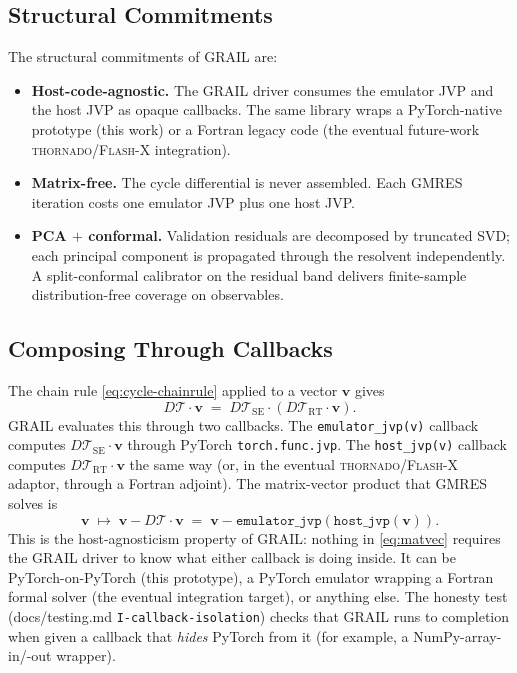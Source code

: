 \documentclass[11pt]{article}
\newcommand{\Tcyc}{\mathcal{T}}
\newcommand{\Trt}{\Tcyc_{\mathrm{RT}}}
\newcommand{\Tse}{\Tcyc_{\mathrm{SE}}}
\newcommand{\code}[1]{\texttt{#1}}
\begin{document}
\subsection{Structural Commitments}

The structural commitments of GRAIL are:
\begin{itemize}
\item \textbf{Host-code-agnostic.}  The GRAIL driver consumes the
emulator JVP and the host JVP as opaque callbacks.  The same library
wraps a PyTorch-native prototype (this work) or a Fortran legacy code
(the eventual future-work \textsc{thornado}/\textsc{Flash-X} integration).
\item \textbf{Matrix-free.}  The cycle differential is never
assembled.  Each GMRES iteration costs one emulator JVP plus one host
JVP.
\item \textbf{PCA $+$ conformal.}  Validation residuals are decomposed
by truncated SVD; each principal component is propagated through the
resolvent independently.  A split-conformal calibrator on the residual
band delivers finite-sample distribution-free coverage on
observables.
\end{itemize}

\subsection{Composing Through Callbacks}

The chain rule \eqref{eq:cycle-chainrule} applied to a vector $\mathbf{v}$
gives
\begin{equation}
D\Tcyc \cdot \mathbf{v} \;=\; D\Tse \cdot (D\Trt \cdot \mathbf{v}).
\end{equation}
GRAIL evaluates this through two callbacks.  The
\texttt{emulator\_jvp(v)} callback computes $D\Tse \cdot \mathbf{v}$
through PyTorch \code{torch.func.jvp}.  The \texttt{host\_jvp(v)}
callback computes $D\Trt \cdot \mathbf{v}$ the same way (or, in the
eventual \textsc{thornado}/\textsc{Flash-X} adaptor, through a Fortran
adjoint).  The matrix-vector product that GMRES solves is
\begin{equation}
\mathbf{v} \;\mapsto\; \mathbf{v} - D\Tcyc \cdot \mathbf{v}
\;=\; \mathbf{v} - \mathtt{emulator\_jvp}(\mathtt{host\_jvp}(\mathbf{v})).
\label{eq:matvec}
\end{equation}
This is the host-agnosticism property of GRAIL: nothing in
\eqref{eq:matvec} requires the GRAIL driver to know what either
callback is doing inside.  It can be PyTorch-on-PyTorch (this
prototype), a PyTorch emulator wrapping a Fortran formal solver (the
eventual integration target), or anything else.  The honesty test
(docs/testing.md \texttt{I-callback-isolation}) checks that GRAIL runs to
completion when given a callback that \emph{hides} PyTorch from it
(for example, a NumPy-array-in/-out wrapper).
\end{document}
